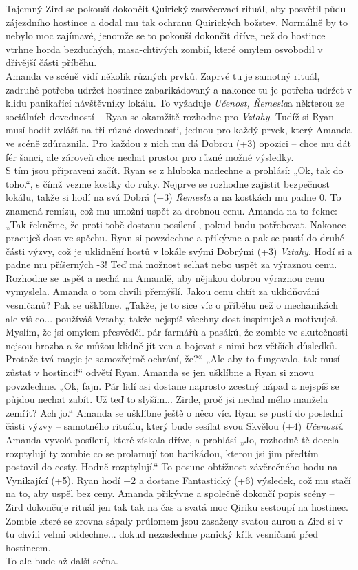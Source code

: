 \documentclass[../main.tex]{subfiles}
\begin{document}
Tajemný Zird se pokouší dokončit Quirický zasvěcovací rituál, aby posvětil půdu zájezdního hostince a dodal mu tak ochranu Quirických božstev. Normálně by to nebylo moc zajímavé, jenomže se to pokouší dokončit dříve, než do hostince vtrhne horda bezduchých, masa-chtivých zombií, které omylem osvobodil v dřívější části příběhu.\\
Amanda ve scéně vidí několik různých prvků. Zaprvé tu je samotný rituál, zadruhé potřeba udržet hostinec zabarikádovaný a nakonec tu je potřeba udržet v klidu panikařící návštěvníky lokálu. To vyžaduje \textit{Učenost, Řemesla}a některou ze sociálních dovedností – Ryan se okamžitě rozhodne pro \textit{Vztahy}. Tudíž si Ryan musí hodit zvlášť na tři různé dovednosti, jednou pro každý prvek, který Amanda ve scéně zdůraznila. Pro každou z nich mu dá Dobrou (+3) opozici – chce mu dát fér šanci, ale zároveň chce nechat prostor pro různé možné výsledky.\\
S tím jsou připraveni začít. Ryan se z hluboka nadechne a prohlásí: „Ok, tak do toho.“, s čímž vezme kostky do ruky. Nejprve se rozhodne zajistit bezpečnost lokálu, takže si hodí na svá Dobrá (+3) \textit{Řemesla} a na kostkách mu padne 0. To znamená remízu, což mu umožní uspět za drobnou cenu. Amanda na to řekne: „Tak řekněme, že proti tobě dostanu posílení , pokud budu potřebovat. Nakonec pracuješ dost ve spěchu. Ryan si povzdechne a přikývne a pak se pustí do druhé části výzvy, což je uklidnění hostů v lokále svými Dobrými (+3) \textit{Vztahy}. Hodí si a padne mu příšerných -3! Teď má možnost selhat nebo uspět za výraznou cenu. Rozhodne se uspět a nechá na Amandě, aby nějakou dobrou výraznou cenu vymyslela. Amanda o tom chvíli přemýšlí. Jakou cenu chtít za uklidňování vesničanů? Pak se ušklíbne. „Takže, je to sice víc o příběhu než o mechanikách ale víš co... používáš Vztahy, takže nejspíš všechny dost inspiruješ a motivuješ. Myslím, že jsi omylem přesvědčil pár farmářů a pasáků, že zombie ve skutečnosti nejsou hrozba a že můžou klidně jít ven a bojovat s nimi bez větších důsledků. Protože tvá magie je samozřejmě ochrání, že?“ „Ale aby to fungovalo, tak musí zůstat v hostinci!“ odvětí Ryan. Amanda se jen ušklíbne a Ryan si znovu povzdechne. „Ok, fajn. Pár lidí asi dostane naprosto zcestný nápad a nejspíš se půjdou nechat zabít. Už teď to slyším... Zirde, proč jsi nechal mého manžela zemřít? Ach jo.“ Amanda se ušklíbne ještě o něco víc. Ryan se pustí do poslední části výzvy – samotného rituálu, který bude sesílat svou Skvělou (+4) \textit{Učeností}. Amanda vyvolá posílení, které získala dříve, a prohlásí „Jo, rozhodně tě docela rozptylují ty zombie co se prolamují tou barikádou, kterou jsi jim předtím postavil do cesty. Hodně rozptylují.“ To posune obtížnost závěrečného hodu na Vynikající (+5). Ryan hodí +2 a dostane Fantastický (+6) výsledek, což mu stačí na to, aby uspěl bez ceny. Amanda přikývne a společně dokončí popis scény – Zird dokončuje rituál jen tak tak na čas a svatá moc Qiriku sestoupí na hostinec. Zombie které se zrovna sápaly průlomem jsou zasaženy svatou aurou a Zird si v tu chvíli velmi oddechne... dokud nezaslechne panický křik vesničanů před hostincem.\\
To ale bude až další scéna.
\end{document}
